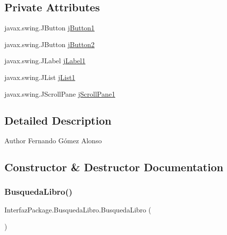\subsection*{Private Attributes}
\begin{DoxyCompactItemize}
\item 
javax.\+swing.\+J\+Button \mbox{\hyperlink{class_interfaz_package_1_1_busqueda_libro_a8bd603a21b300bd0b31210ae9756c361}{j\+Button1}}
\item 
javax.\+swing.\+J\+Button \mbox{\hyperlink{class_interfaz_package_1_1_busqueda_libro_a1cb7663746354ace608d7846c3d86105}{j\+Button2}}
\item 
javax.\+swing.\+J\+Label \mbox{\hyperlink{class_interfaz_package_1_1_busqueda_libro_ae9603cba787d7c8cd78d9a35ac7c31ab}{j\+Label1}}
\item 
javax.\+swing.\+J\+List \mbox{\hyperlink{class_interfaz_package_1_1_busqueda_libro_a44542e61409368d4f638e77765ab785f}{j\+List1}}
\item 
javax.\+swing.\+J\+Scroll\+Pane \mbox{\hyperlink{class_interfaz_package_1_1_busqueda_libro_a2c5f99da1566043c6ead6bf6bc702bfa}{j\+Scroll\+Pane1}}
\end{DoxyCompactItemize}


\subsection{Detailed Description}
\begin{DoxyAuthor}{Author}
Fernando Gómez Alonso 
\end{DoxyAuthor}


\subsection{Constructor \& Destructor Documentation}
\mbox{\label{class_interfaz_package_1_1_busqueda_libro_a81c88fc8c319bd5a2f2869fa751f8571}} 
\subsubsection{\texorpdfstring{Busqueda\+Libro()}{BusquedaLibro()}}
{\footnotesize\ttfamily Interfaz\+Package.\+Busqueda\+Libro.\+Busqueda\+Libro (\begin{DoxyParamCaption}{ }\end{DoxyParamCaption})\hspace{0.3cm}{\ttfamily [inline]}}

